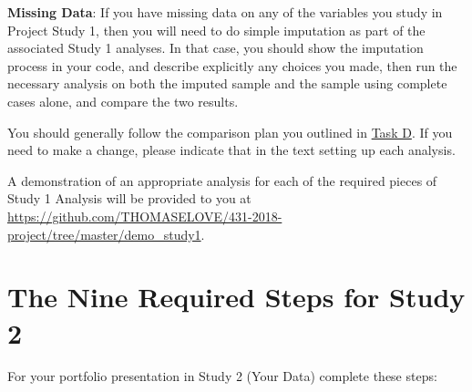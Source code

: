 \documentclass[]{book}
\theoremstyle{definition}
\theoremstyle{definition}
\theoremstyle{definition}
\theoremstyle{remark}
\begin{document}
\textbf{Missing Data}: If you have missing data on any of the variables
you study in Project Study 1, then you will need to do simple imputation
as part of the associated Study 1 analyses. In that case, you should
show the imputation process in your code, and describe explicitly any
choices you made, then run the necessary analysis on both the imputed
sample and the sample using complete cases alone, and compare the two
results.

You should generally follow the comparison plan you outlined in
\protect\hyperlink{taskD}{Task D}. If you need to make a change, please
indicate that in the text setting up each analysis.

A demonstration of an appropriate analysis for each of the required
pieces of Study 1 Analysis will be provided to you at
\url{https://github.com/THOMASELOVE/431-2018-project/tree/master/demo_study1}.

\hypertarget{the-nine-required-steps-for-study-2}{%
\section{The Nine Required Steps for Study
2}\label{the-nine-required-steps-for-study-2}}

For your portfolio presentation in Study 2 (Your Data) complete these
steps:
\end{document}
